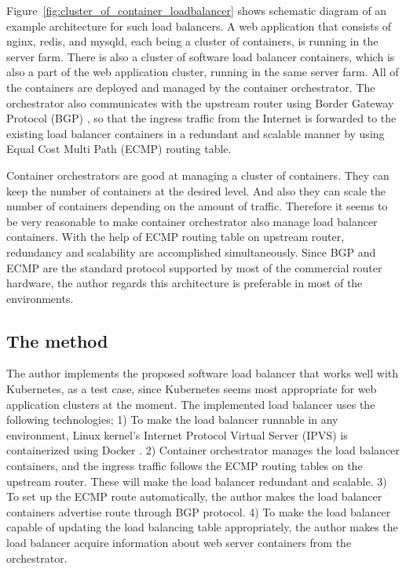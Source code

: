 Figure~\ref{fig:cluster_of_container_loadbalancer} shows schematic diagram of an example architecture for such load balancers.
A web application that consists of nginx, redis, and mysqld, each being a cluster of containers, is running in the server farm.
There is also a cluster of software load balancer containers, which is also a part of the web application cluster, running in the same server farm. 
All of the containers are deployed and managed by the container orchestrator.
The orchestrator also communicates with the upstream router using Border Gateway Protocol (BGP) \cite{rfc7911}, so that the ingress traffic from the Internet is forwarded to the existing load balancer containers in a redundant and scalable manner by using Equal Cost Multi Path (ECMP) \cite{al2008scalable} routing table.


  Container orchestrators are good at managing a cluster of containers.
  They can keep the number of containers at the desired level.
  And also they can scale the number of containers depending on the amount of traffic.
  Therefore it seems to be very reasonable to make container orchestrator also manage load balancer containers.
  With the help of ECMP routing table on upstream router, redundancy and scalability are accomplished simultaneously.
  Since BGP and ECMP are the standard protocol supported by most of the commercial router hardware, the author regards this architecture is preferable in most of the environments.






\subsection{The method}




  The author implements the proposed software load balancer that works well with Kubernetes, as a test case, since Kubernetes seems most appropriate for web application clusters at the moment.
  The implemented load balancer uses the following technologies;
  1) To make the load balancer runnable in any environment, Linux kernel's Internet Protocol Virtual Server (IPVS) \cite{Zhang2000} is containerized using Docker \cite{merkel2014docker}.
  2) Container orchestrator manages the load balancer containers, and the ingress traffic follows the  ECMP routing tables on the upstream router. These will make the load balancer redundant and scalable.
  3) To set up the ECMP route automatically, the author makes the load balancer containers advertise route through BGP protocol.
  4) To make the load balancer capable of updating the load balancing table appropriately, the author makes the load balancer acquire information about web server containers from the orchestrator.



